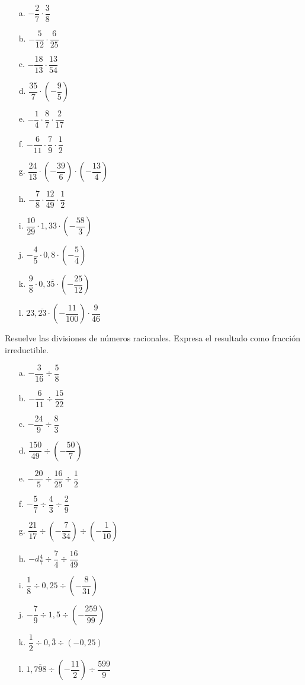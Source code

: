 \documentclass[spanish,letterpaper, 11pt, addpoints, answers]{exam}
\begin{document}
\begin{questions}
  \begin{multicols}{2}
    \begin{itemize}
      \item[a.] $-\dfrac{2}{7}\cdot \dfrac{3}{8}$
      \item[b.] $-\dfrac{5}{12}\cdot \dfrac{6}{25}$
      \item[c.] $-\dfrac{18}{13}\cdot \dfrac{13}{54}$
      \item[d.] $\dfrac{35}{7}\cdot \left(-\dfrac{9}{5}\right)$
      \item[e.] $-\dfrac{1}{4}\cdot \dfrac{8}{7}\cdot \dfrac{2}{17}$
      \item[f.] $-\dfrac{6}{11}\cdot \dfrac{7}{9}\cdot \dfrac{1}{2}$
      \item[g.] $\dfrac{24}{13}\cdot \left(-\dfrac{39}{6}\right)\cdot \left(-\dfrac{13}{4}\right)$
      \item[h.] $-\dfrac{7}{8}\cdot \dfrac{12}{49}\cdot \dfrac{1}{2}$
      \item[i.] $\dfrac{10}{29}\cdot 1{,}33\cdot \left(-\dfrac{58}{3}\right)$
      \item[j.] $-\dfrac{4}{5}\cdot 0{,}8\cdot \left(-\dfrac{5}{4}\right)$
      \item[k.] $\dfrac{9}{8}\cdot 0{,}3\overline{5}\cdot \left(-\dfrac{25}{12}\right)$
      \item[l.] $23{,}\overline{23}\cdot \left(-\dfrac{11}{100}\right)\cdot \dfrac{9}{46}$
    \end{itemize}
  \end{multicols}

  \question Resuelve las divisiones de números racionales. Expresa el resultado como fracción irreductible.

  \begin{multicols}{2}
    \begin{itemize}
      \item[a.] $-\dfrac{3}{16}\div \dfrac{5}{8}$
      \item[b.] $-\dfrac{6}{11}\div \dfrac{15}{22}$
      \item[c.] $-\dfrac{24}{9}\div \dfrac{8}{3}$
      \item[d.] $\dfrac{150}{49}\div \left(-\dfrac{50}{7}\right)$
      \item[e.] $-\dfrac{20}{5}\div \dfrac{16}{25}\div \dfrac{1}{2}$
      \item[f.] $-\dfrac{5}{7}\div \dfrac{4}{3}\div \dfrac{2}{9}$
      \item[g.] $\dfrac{21}{17}\div \left(-\dfrac{7}{34}\right)\div \left(-\dfrac{1}{10}\right)$
      \item[h.] $-d\frac{4}{7}\div \dfrac{7}{4}\div \dfrac{16}{49}$
      \item[i.] $\dfrac{1}{8}\div 0{,}25\div \left(-\dfrac{8}{31}\right)$
      \item[j.] $-\dfrac{7}{9}\div 1{,}5\div \left(-\dfrac{259}{99}\right)$
      \item[k.] $\dfrac{1}{2}\div 0{,}\overline{3}\div \left(-0{,}25\right)$
      \item[l.] $1{,}\overline{798}\div \left(-\dfrac{11}{2}\right)\div \dfrac{599}{9}$
    \end{itemize}
  \end{multicols}


\end{questions}
\end{document}

